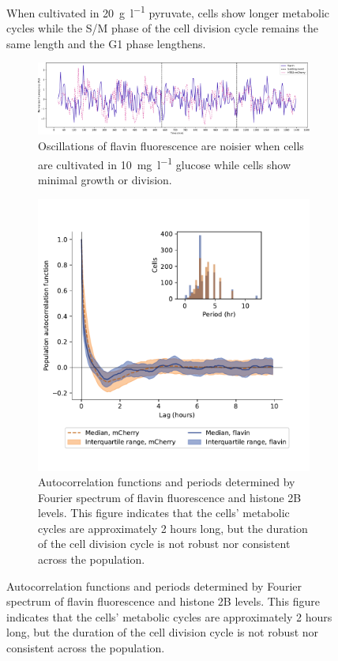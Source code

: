 \begin{figure}
  \caption{
    When cultivated in \SI{20}{\gram~\litre^{-1}} pyruvate, cells show longer metabolic cycles while the S/M phase of the cell division cycle remains the same length and the G1 phase lengthens.
  }
  \label{fig:biology-pyruvate}
\end{figure}


\begin{figure}
  \centering
  \begin{subfigure}[htpb]{1.0\textwidth}
   \centering
   \includegraphics[width=\textwidth]{limiting_single_birth_plot_edit.pdf}
   \caption{
     Oscillations of flavin fluorescence are noisier when cells are cultivated in \SI{10}{\milli\gram~\litre^{-1}} glucose while cells show minimal growth or division.
   }
   \label{fig:biology-lowglc-single}
  \end{subfigure}

  \begin{subfigure}[htpb]{0.7\textwidth}
   \centering
   \includegraphics[width=\textwidth]{htb2mCherry_31492_12.pdf}
   \caption{
     Autocorrelation functions and periods determined by Fourier spectrum of flavin fluorescence and histone 2B levels.
     This figure indicates that the cells' metabolic cycles are approximately 2 hours long, but the duration of the cell division cycle is not robust nor consistent across the population.
   }
   \label{fig:biology-lowglc-acf}
  \end{subfigure}


\end{figure}
